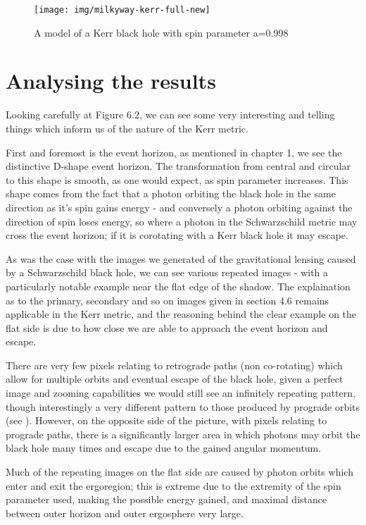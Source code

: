 \documentclass[oneside,openright,frontopenright, singlespacing]{dmathesis}
\begin{document}
\begin{figure}[!ht]
	\centering
	\texttt{[image: img/milkyway-kerr-full-new]}
	\caption{A model of a Kerr black hole with spin parameter a=0.998}
\end{figure}

\section{Analysing the results}

	Looking carefully at Figure 6.2, we can see some very interesting and telling things which inform us of the nature of the Kerr metric. 

\vspace{1em}
	First and foremost is the event horizon, as mentioned in chapter 1, we see the distinctive D-shape event horizon. The transformation from central and circular to this shape is smooth, as one would expect, as spin parameter increases. This shape comes from the fact that a photon orbiting the black hole in the same direction as it's spin gains energy - and conversely a photon orbiting against the direction of spin loses energy, so where a photon in the Schwarzschild metric may cross the event horizon; if it is corotating with a Kerr black hole it may escape.

\vspace{1em}
	As was the case with the images we generated of the gravitational lensing caused by a Schwarzschild black hole, we can see various repeated images - with a particularly notable example near the flat edge of the shadow. The explaination as to the primary, secondary and so on images given in section 4.6 remains applicable in the Kerr metric, and the reasoning behind the clear example on the flat side is due to how close we are able to approach the event horizon and escape. 

\vspace{1em}
	There are very few pixels relating to retrograde paths (non co-rotating) which allow for multiple orbits and eventual escape of the black hole, given a perfect image and zooming capabilities we would still see an infinitely repeating pattern, though interestingly a very different pattern to those produced by prograde orbits (see \cite{riazuelo2012some}). However, on the opposite side of the picture, with pixels relating to prograde paths, there is a significantly larger area in which photons may orbit the black hole many times and escape due to the gained angular momentum.

\vspace{1em}
	Much of the repeating images on the flat side are caused by photon orbits which enter and exit the ergoregion; this is extreme due to the extremity of the spin parameter used, making the possible energy gained, and maximal distance between outer horizon and outer ergosphere very large.
\end{document}
